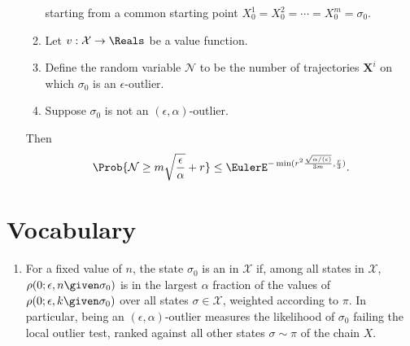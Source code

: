 \documentclass[12pt]{article}
\begin{document}
\begin{enumerate}
\begin{theorem}
\begin{enumerate}
                    starting from a common starting point \( X_0^1 = X_0^2
                    = \cdots = X_0^m = \sigma_0 \).
                \item
                    Let \( v :  \mathcal{X} \to \Reals \) be a value
                    function.
                \item
                    Define the random variable \( \mathcal{N} \) to be
                    the number of trajectories \( \mathbf{X}^i \) on
                    which \( \sigma_0 \) is an \( \epsilon \)-outlier.
                \item
                    Suppose \( \sigma_0 \) is not an \( (\epsilon,
                    \alpha) \)-outlier.
            \end{enumerate}
            Then
            \[
                \Prob{\mathcal{N} \ge m \sqrt{\frac{\epsilon}{\alpha}} +
                r} \le \EulerE^{-\min(r^2 \frac{\sqrt{\alpha/(\epsilon)}}
                {3m}, \frac{r} {3})}.
            \]
        \end{theorem}
\end{enumerate}
\renewcommand{\theenumii}{\alph{enumii}}

\hr

\section*{Vocabulary}
\begin{enumerate}
    \item
        For a fixed value of \( n \), the state \( \sigma_0 \) is an
         in \( \mathcal{X} \) if,
        among all states in \( \mathcal{X} \), \( \rho(0; \epsilon, n
        \given \sigma_{0}) \) is in the largest \( \alpha \) fraction of
        the values of \( \rho(0; \epsilon, k \given \sigma_{0}) \) over
        all states \( \sigma \in \mathcal{X} \), weighted according to \(
        \pi \).  In particular, being an \( (\epsilon, \alpha) \)-outlier
        measures the likelihood of \( \sigma_0 \) failing the local
        outlier test, ranked against all other states \( \sigma \sim \pi
        \) of the chain \( X \).
\end{enumerate}

\hr
\end{document}
